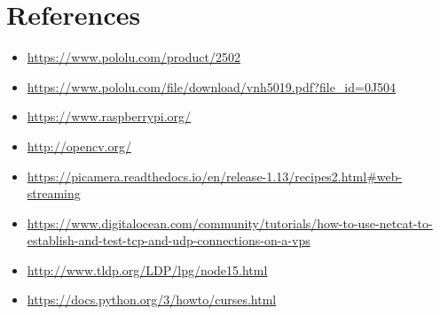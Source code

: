 \documentclass[12pt,a4paper]{article}
\begin{document}
\pagebreak
\section{References}
\begin{itemize}
 \item \href{https://www.pololu.com/product/2502}{https://www.pololu.com/product/2502}
 \item \href{https://www.pololu.com/file/download/vnh5019.pdf?file_id=0J504}{https://www.pololu.com/file/download/vnh5019.pdf?file\_id=0J504}
 \item \href{https://www.raspberrypi.org/}{https://www.raspberrypi.org/}
 \item \href{http://opencv.org/}{http://opencv.org/}
 \item \href{https://picamera.readthedocs.io/en/release-1.13/recipes2.html#web-streaming}{https://picamera.readthedocs.io/en/release-1.13/recipes2.html\#web-streaming}
 \item \href{https://www.digitalocean.com/community/tutorials/how-to-use-netcat-to-establish-and-test-tcp-and-udp-connections-on-a-vps}{https://www.digitalocean.com/community/tutorials/how-to-use-netcat-to-establish-and-test-tcp-and-udp-connections-on-a-vps}
 \item \href{http://www.tldp.org/LDP/lpg/node15.html}{http://www.tldp.org/LDP/lpg/node15.html}
 \item \href{https://docs.python.org/3/howto/curses.html}{https://docs.python.org/3/howto/curses.html}
 
\end{itemize}
\end{document}
